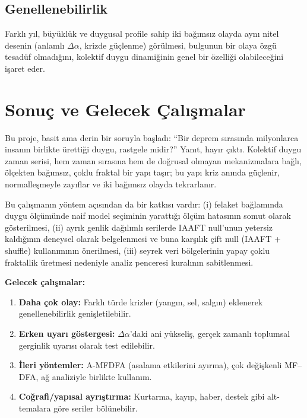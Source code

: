 \documentclass[11pt,a4paper]{article}
\newcommand{\Dal}{\Delta\alpha}
\begin{document}
\subsection{Genellenebilirlik}

Farklı yıl, büyüklük ve duygusal profile sahip iki bağımsız olayda aynı
nitel desenin (anlamlı $\Dal$, krizde güçlenme) görülmesi, bulgunun bir
olaya özgü tesadüf olmadığını, kolektif duygu dinamiğinin genel bir özelliği
olabileceğini işaret eder.

\section{Sonuç ve Gelecek Çalışmalar}

Bu proje, basit ama derin bir soruyla başladı: ``Bir deprem sırasında
milyonlarca insanın birlikte ürettiği duygu, rastgele midir?'' Yanıt, hayır
çıktı. Kolektif duygu zaman serisi, hem zaman sırasına hem de doğrusal
olmayan mekanizmalara bağlı, ölçekten bağımsız, çoklu fraktal bir yapı taşır;
bu yapı kriz anında güçlenir, normalleşmeyle zayıflar ve iki bağımsız olayda
tekrarlanır.

Bu çalışmanın yöntem açısından da bir katkısı vardır: (i) felaket bağlamında
duygu ölçümünde naif model seçiminin yarattığı ölçüm hatasının somut olarak
gösterilmesi, (ii) ayrık genlik dağılımlı serilerde IAAFT null'unun yetersiz
kaldığının deneysel olarak belgelenmesi ve buna karşılık çift null
(IAAFT + shuffle) kullanımının önerilmesi, (iii) seyrek veri bölgelerinin
yapay çoklu fraktallik üretmesi nedeniyle analiz penceresi kuralının
sabitlenmesi.

\textbf{Gelecek çalışmalar:}
\begin{enumerate}[leftmargin=1.6em]
  \item \textbf{Daha çok olay:} Farklı türde krizler (yangın, sel, salgın)
        eklenerek genellenebilirlik genişletilebilir.
  \item \textbf{Erken uyarı göstergesi:} $\Dal$'daki ani yükseliş, gerçek
        zamanlı toplumsal gerginlik uyarısı olarak test edilebilir.
  \item \textbf{İleri yöntemler:} A-MFDFA (asalama etkilerini ayırma),
        çok değişkenli MF--DFA, ağ analiziyle birlikte kullanım.
  \item \textbf{Coğrafi/yapısal ayrıştırma:} Kurtarma, kayıp, haber, destek
        gibi alt-temalara göre seriler bölünebilir.
\end{enumerate}
\end{document}
